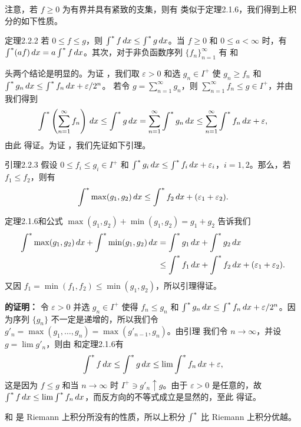 注意，若 $f\ge0$ 为有界并具有紧致的支集，则有
类似于定理2.1.6，我们得到上积分的如下性质。
\begin{statement}{定理}{2.2.2}
若 $0\le f\le g$，则 $\int^{*} f\,dx\le\int^{*} g\,dx$。当 $f\ge0$ 和 $0\le a<\infty$ 时，有 $\int^{*}(af)\,dx=a\int^{*} f\,dx$。其次，对于非负函数序列 $\{f_n\}_{n=1}^\infty$ 有
和
\end{statement}
\Proof 头两个结论是明显的。为证 ，我们取 $\varepsilon>0$ 和选 $g_n\in I^+$ 使 $g_n\ge f_n$ 和 $\int^{*} g_n\,dx\le\int^{*} f_n\,dx+\varepsilon/2^n$。
若令 $g=\sum_{n=1}^\infty g_n$，则 $\sum_{n=1}^\infty f_n\le g\in I^+$，并由  我们得到
\[\int^{*}\left(\sum_{n=1}^\infty f_n\right)\,dx\le\int^{*} g\,dx=\sum_{n=1}^\infty\int^{*} g_n\,dx\le\sum_{n=1}^\infty\int^{*} f_n\,dx+\varepsilon,\]
由此  得证。为证 ，我们先证如下引理。
\begin{statement}{引理}{2.2.3}
假设 $0\le f_i\le g_i\in I^+$ 和 $\int^{*} g_i\,dx\le\int^{*} f_i\,dx+\varepsilon_i$，$i=1,2$。那么，若 $f_1\le f_2$，则有
\[\int^{*}\max(g_1,g_2)\,dx\le\int^{*} f_2\,dx+(\varepsilon_1+\varepsilon_2).\]
\end{statement}
\Proof 定理2.1.6和公式 $\max(g_1,g_2)+\min(g_1,g_2)=g_1+g_2$ 告诉我们
\[\begin{aligned}\int^{*}\max(g_1,g_2)\,dx+\int^{*}\min(g_1,g_2)\,dx
&=\int^{*} g_1\,dx+\int^{*} g_2\,dx\\&\le\int^{*} f_1\,dx+\int^{*} f_2\,dx+(\varepsilon_1+\varepsilon_2).\end{aligned}\]
又因 $f_1=\min(f_1,f_2)\le\min(g_1,g_2)$，所以引理得证。

\textbf{的证明：} 令 $\varepsilon>0$ 并选 $g_n\in I^+$ 使得 $f_n\le g_n$ 和 $\int^{*} g_n\,dx\le\int^{*} f_n\,dx+\varepsilon/2^n$。因为序列 $\{g_n\}$ 不一定是递增的，所以我们令 $g'_n=\max(g_1,\ldots,g_n)=\max(g'_{n-1},g_n)$。由引理
我们令 $n\to\infty$，并设 $g=\lim g'_n$，则由  和定理2.1.6有
\[\int^{*} f\,dx\le\int^{*} g\,dx\le\lim\int^{*} f_n\,dx+\varepsilon,\]
这是因为 $f\le g$ 和当 $n\to\infty$ 时 $I^+\ni g'_n\uparrow g$。由于 $\varepsilon>0$ 是任意的，故 $\int^{*} f\,dx\le\lim\int^{*} f_n\,dx$，而反方向的不等式成立是显然的，至此  得证。

 和  是 Riemann 上积分所没有的性质，所以上积分 $\int^{*}$ 比 Riemann 上积分优越。
